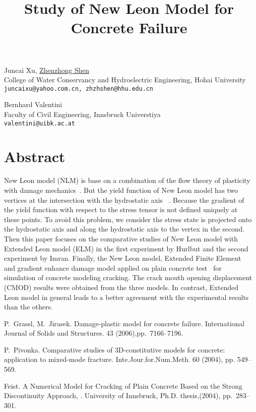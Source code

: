 \title{Study of New Leon Model for Concrete Failure}
\author{} \institute{}
\maketitle

\begin{center}
{\large  Juncai Xu, \underline {Zhenzhong Shen}}\\
College of Water Conservancy and Hydroelectric Engineering, Hohai University\\
{\tt juncaixu@yahoo.com.cn, zhzhshen@hhu.edu.cn}\\
\vspace{4mm}

{\large {Bernhard Valentini}}\\
Faculty of Civil Engineering, Innsbruck Universtiya\\
{\tt valentini@uibk.ac.at}
\end{center}

\section*{Abstract}
New Leon model (NLM) is base on a combination of the flow theory of plasticity with damage mechanics~\cite{Grassl}. But the yield function of New Leon model has two vertices at the intersection with the hydrostatic axis ~\cite{Pivonka}. Because the gradient of the yield function with respect to the stress tensor is not defined uniquely at these points. To avoid this problem, we consider the stress state is projected onto the hydrostatic axis and along the hydrostatic axis to the vertex in the second. Then this paper focuses on the comparative studies of New Leon model with Extended Leon model (ELM) in the first experiment by Hurlbut and the second experiment by Imran. Finally, the New Leon model, Extended Finite Element and gradient enhance damage model applied on plain concrete test~\cite{Feist} for simulation of concrete modeling cracking. The crack mouth opening displacement (CMOD) results were obtained from the three models. In contrast, Extended Leon model in general leads to a better agreement with the experimental results than the others.


\begin{thebibliography}{10}
{\sc P.~Grassl, M.~Jirasek}. {Damage-plastic model for concrete failure}. International Journal of Solids and Structures. 43 (2006),pp.~7166--7196.

{\sc P.~Pivonka}. {Comparative studies of 3D-constitutive models for concrete: application to mixed-mode fracture}. Inte.Jour.for.Num.Meth. 60 (2004), pp. 549--569.

{\sc Feist}. {A Numerical Model for Cracking of Plain Concrete Based on the Strong Discontinuity Approach, }. University of Innsbruck, Ph.D. thesis,(2004), pp.~283--301.
\end{thebibliography}